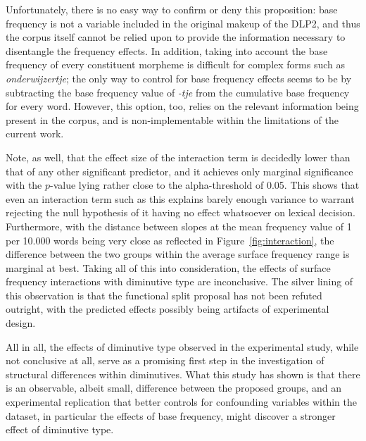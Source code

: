 Unfortunately, there is no easy way to confirm or deny this proposition: base frequency is not a variable included in the original makeup of the DLP2, and thus the corpus itself cannot be relied upon to provide the information necessary to disentangle the frequency effects. In addition, taking into account the base frequency of every constituent morpheme is difficult for complex forms such as \textit{onderwijzertje}; the only way to control for base frequency effects seems to be by subtracting the base frequency value of \textit{-tje} from the cumulative base frequency for every word. However, this option, too, relies on the relevant information being present in the corpus, and is non-implementable within the limitations of the current work.

Note, as well, that the effect size of the interaction term is decidedly lower than that of any other significant predictor, and it achieves only marginal significance with the $p$-value lying rather close to the alpha-threshold of 0.05. This shows that even an interaction term such as this explains barely enough variance to warrant rejecting the null hypothesis of it having no effect whatsoever on lexical decision. Furthermore, with the distance between slopes at the mean frequency value of 1 per 10.000 words being very close as reflected in Figure~\ref{fig:interaction}, the difference between the two groups within the average surface frequency range is marginal at best. Taking all of this into consideration, the effects of surface frequency interactions with diminutive type are inconclusive. The silver lining of this observation is that the functional split proposal has not been refuted outright, with the predicted effects possibly being artifacts of experimental design.

All in all, the effects of diminutive type observed in the experimental study, while not conclusive at all, serve as a promising first step in the investigation of structural differences within diminutives. What this study has shown is that there is an observable, albeit small, difference between the proposed groups, and an experimental replication that better controls for confounding variables within the dataset, in particular the effects of base frequency, might discover a stronger effect of diminutive type.

